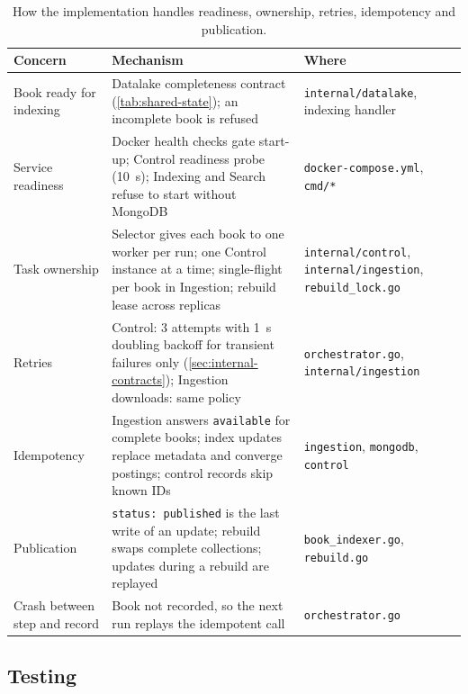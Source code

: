 \documentclass[10pt,a4paper]{article}
\newcommand{\code}[1]{\texttt{#1}}
\begin{document}
\begin{table}[htbp]
  \centering
  \footnotesize
  \caption{How the implementation handles readiness, ownership, retries,
  idempotency and publication.}
  \label{tab:mechanisms}
  \begin{tabularx}{\textwidth}{@{}>{\raggedright\arraybackslash}p{2.75cm}>{\raggedright\arraybackslash}X>{\raggedright\arraybackslash}p{3.5cm}@{}}
    \toprule
    Concern & Mechanism & Where \\
    \midrule
    Book ready for indexing & Datalake completeness contract
      (\cref{tab:shared-state}); an incomplete book is refused &
      \code{internal/datalake}, indexing handler \\
    Service readiness & Docker health checks gate start-up; Control readiness
      probe (10~s); Indexing and Search refuse to start without MongoDB &
      \code{docker-compose.yml}, \code{cmd/*} \\
    Task ownership & Selector gives each book to one worker per run; one
      Control instance at a time; single-flight per book in Ingestion; rebuild
      lease across replicas & \code{internal/control},
      \code{internal/ingestion}, \code{rebuild\_lock.go} \\
    Retries & Control: 3 attempts with 1~s doubling backoff for transient
      failures only (\cref{sec:internal-contracts}); Ingestion downloads: same
      policy &
      \code{orchestrator.go}, \code{internal/ingestion} \\
    Idempotency & Ingestion answers \code{available} for complete books;
      index updates replace metadata and converge postings; control records
      skip known IDs & \code{ingestion}, \code{mongodb}, \code{control} \\
    Publication & \code{status: published} is the last write of an update;
      rebuild swaps complete collections; updates during a rebuild are replayed
      & \code{book\_indexer.go}, \code{rebuild.go} \\
    Crash between step and record & Book not recorded, so the next run replays
      the idempotent call & \code{orchestrator.go} \\
    \bottomrule
  \end{tabularx}
\end{table}

\subsection{Testing}
\label{sec:testing}
\end{document}
